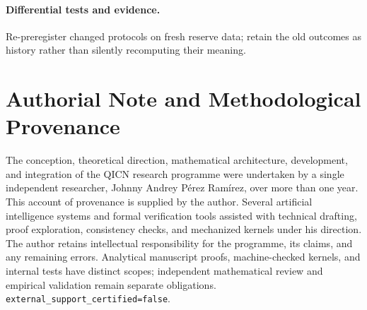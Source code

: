 \documentclass[11pt,a4paper]{article}
\begin{document}
\paragraph{Differential tests and evidence.} Re-preregister changed protocols on fresh reserve data; retain the old outcomes as history rather than silently recomputing their meaning.



\printbibliography

\section*{Authorial Note and Methodological Provenance}
The conception, theoretical direction, mathematical architecture, development,
and integration of the QICN research programme were undertaken by a single
independent researcher, Johnny Andrey P\'erez Ram\'irez, over more than one year.
This account of provenance is supplied by the author. Several artificial
intelligence systems and formal verification tools assisted with technical
drafting, proof exploration, consistency checks, and mechanized kernels under
his direction. The author retains intellectual responsibility for the
programme, its claims, and any remaining errors. Analytical manuscript proofs,
machine-checked kernels, and internal tests have distinct scopes; independent
mathematical review and empirical validation remain separate obligations.
\texttt{external\_support\_certified=false}.
\end{document}
